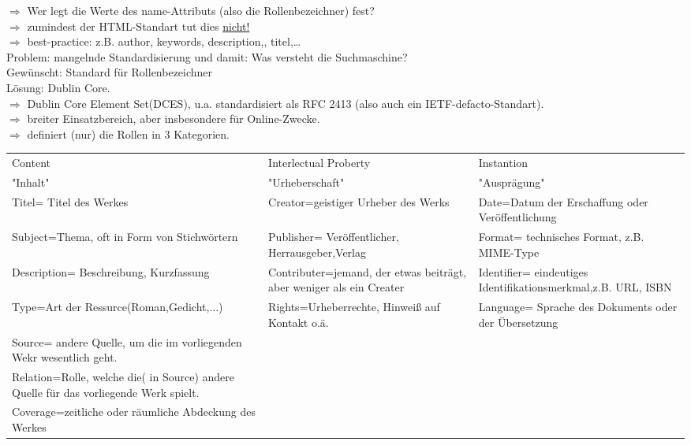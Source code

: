$\Rightarrow$ Wer legt die Werte des name-Attributs (also die Rollenbezeichner) fest?\\
$\Rightarrow$ zumindest der HTML-Standart tut dies \underline{nicht!}\\
$\Rightarrow$ best-practice: z.B. author, keywords, description,, titel,\dots\\
Problem: mangelnde Standardisierung und damit: Was versteht die Suchmaschine?\\
Gewünscht: Standard für Rollenbezeichner\\
Lösung: Dublin Core.\\
$\Rightarrow$ Dublin Core Element Set(DCES), u.a. standardisiert als RFC 2413 (also auch ein IETF-defacto-Standart).\\
$\Rightarrow$ breiter Einsatzbereich, aber insbesondere für Online-Zwecke.\\
$\Rightarrow$ definiert (nur) die Rollen in 3 Kategorien.\\
\newline
\begin{tabularx}{\textwidth}{|X|X|X|}
 \hline 
 Content & Interlectual Proberty & Instantion \\ 
 "Inhalt" & "Urheberschaft" & "Ausprägung" \\ 
 \hline 
 \hline
 Titel= Titel des Werkes & Creator=geistiger Urheber des Werks & Date=Datum der Erschaffung oder Veröffentlichung \\ 
 \hline 
 Subject=Thema, oft in Form von Stichwörtern & Publisher= Veröffentlicher, Herrausgeber,Verlag & Format= technisches Format, z.B. MIME-Type \\ 
 \hline 
 Description= Beschreibung, Kurzfassung & Contributer=jemand, der etwas beiträgt, aber weniger als ein Creater & Identifier= eindeutiges Identifikationsmerkmal,z.B. URL, ISBN \\ 
 \hline 
 Type=Art der Ressurce(Roman,Gedicht,...) & Rights=Urheberrechte, Hinweiß auf Kontakt o.ä. & Language= Sprache des Dokuments oder der Übersetzung \\ 
 \hline 
 Source= andere Quelle, um die im vorliegenden Wekr wesentlich geht. &  &  \\ 
 \hline 
 Relation=Rolle, welche die( in Source) andere Quelle für das vorliegende Werk spielt. &  &  \\ 
 \hline 
 Coverage=zeitliche oder räumliche Abdeckung des Werkes &  &  \\ 
 \hline 
 \end{tabularx}  

